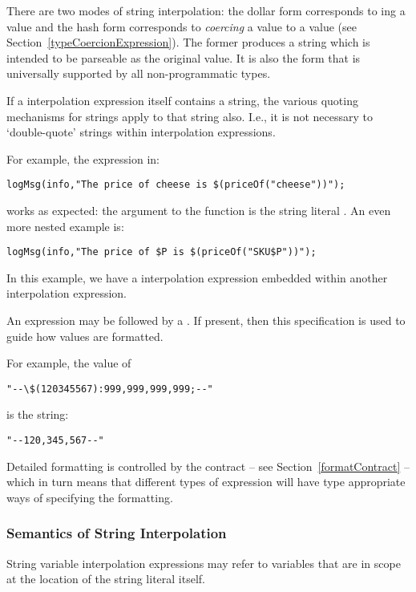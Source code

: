 There are two modes of string interpolation: the dollar form corresponds to ing a value and the hash form corresponds to \emph{coercing} a value to a  value (see Section~\vref{typeCoercionExpression}). The former produces a string which is intended to be parseable as the original value. It is also the form that is universally supported by all non-programmatic types.

\begin{aside}
If a  interpolation expression itself contains a string, the various quoting mechanisms for strings apply to that string also. I.e., it is not necessary to `double-quote' strings within  interpolation expressions.

For example, the  expression in:
\begin{lstlisting}
logMsg(info,"The price of cheese is $(priceOf("cheese"))");
\end{lstlisting}
works as expected: the argument to the  function is the string literal . An even more nested example is:
\begin{lstlisting}
logMsg(info,"The price of $P is $(priceOf("SKU$P"))");
\end{lstlisting}
In this example, we have a  interpolation expression embedded within another  interpolation expression.
\end{aside}

An  expression may be followed by a . If present, then this specification is used to guide how values are formatted.

For example, the value of
\begin{lstlisting}
"--\$(120345567):999,999,999,999;--"
\end{lstlisting}
is the string:
\begin{lstlisting}
"--120,345,567--"
\end{lstlisting}
Detailed formatting is controlled by the  contract -- see Section~\vref{formatContract} -- which in turn means that different types of expression will have type appropriate ways of specifying the formatting.

\subsubsection{Semantics of String Interpolation}

String variable interpolation expressions may refer to variables that are in scope at the location of the string literal itself.

